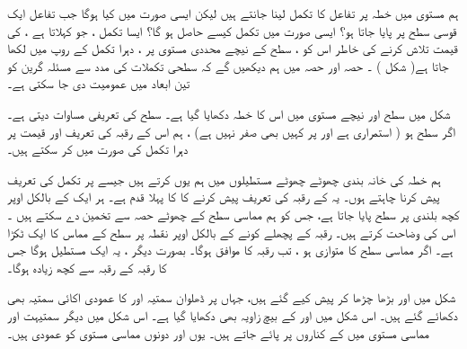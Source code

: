 ہم مستوی  میں   خطہ پر تفاعل کا تکمل لینا جانتے ہیں لیکن ایسی صورت میں کیا ہوگا جب تفاعل ایک قوسی سطح پر پایا جاتا ہو؟    ایسی صورت میں تکمل کیسے حاصل  ہو گا؟ ایسا تکمل  ، جو کہلاتا ہے ، کی قیمت تلاش کرنے کی خاطر      اس کو ، سطح کے نیچے محددی مستوی  پر  ، دہرا تکمل  کے روپ میں لکھا جاتا ہے( شکل  ) ۔ حصہ   اور حصہ  میں ہم دیکھیں گے کہ سطحی تکملات کی مدد سے مسئلہ گرین کو تین ابعاد میں عمومیت دی جا سکتی ہے۔ 

 شکل   میں سطح   اور   نیچے مستوی میں  اس کا   خطہ   دکھایا گیا ہے۔ سطح کی تعریفی مساوات    دیتی  ہے۔اگر سطح    ہو   ( استمراری ہے اور پر کہیں بھی صفر نہیں ہے) ، ہم اس کے رقبہ کی تعریف اور قیمت پر دہرا تکمل کی صورت میں کر سکتے ہیں۔ 
 
 ہم  خطہ کی خانہ بندی چھوٹے چھوٹے مستطیلوں   میں ہم  یوں  کرتے ہیں  جیسے  پر تکمل کی تعریف پیش کرنا چاہتے ہوں۔ یہ کے رقبہ کی تعریف پیش کرنے کا کا پہلا قدم ہے۔ ہر ایک کے بالکل اوپر کچھ بلندی پر سطح پایا جاتا ہے،  جس کو ہم  مماسی سطح کے چھوٹے حصہ سے تخمین دے سکتے ہیں ۔ اس کی  وضاحت کرتے ہیں۔ رقبہ کے پچھلے کونے کے بالکل اوپر نقطہ پر سطح کے مماس کا ایک ٹکڑا ہے۔ اگر مماسی سطح کا متوازی ہو ، تب رقبہ کا  موافق  ہوگا۔  بصورت دیگر ، یہ ایک مستطیل ہوگا جس کا رقبہ کے رقبہ سے کچھ زیادہ ہوگا۔ 
 
  شکل  میں اور  بڑھا چڑھا کر پیش کیے گئے  ہیں،   جہاں پر ڈھلوان سمتیہ
   اور کا عمودی اکائی سمتیہ بھی  دکھائے گئے ہیں۔ اس شکل میں اور کے   بیچ  زاویہ بھی دکھایا گیا ہے۔ اس شکل میں دیگر سمتیہت اور مماسی مستوی میں کے کناروں پر پائے جاتے ہیں۔ یوں اور دونوں مماسی مستوی کو عمودی ہیں۔
  
